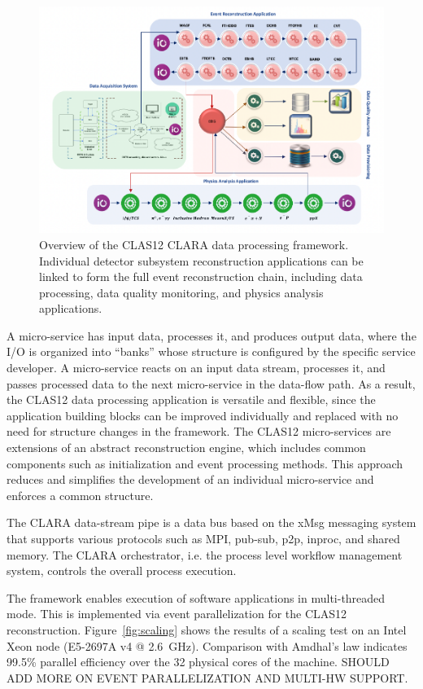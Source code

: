 \begin{figure}[t]
\centering
\includegraphics[width=1.0\textwidth]{pics/clara-overview.pdf}
\caption{Overview of the CLAS12 CLARA data processing framework.  Individual detector subsystem
  reconstruction applications can be linked to form the full event reconstruction chain, including  data processing,
  data quality monitoring, and physics analysis applications.}
\label{fig:clara-overview}
\end{figure}

A micro-service has input data, processes it, and produces output data, where the I/O is organized into ``banks''
whose structure is configured by the specific service developer.  A micro-service reacts on an input data stream,
processes it, and passes processed data to the next micro-service in the data-flow path.  As a result, the CLAS12
data processing application is versatile and flexible, since the application building blocks can be improved individually
and replaced with no need for structure changes in the framework. The CLAS12 micro-services are extensions of an
abstract reconstruction engine, which includes common components such as initialization and event processing
methods. This approach reduces and simplifies the development of an individual micro-service and enforces a common
structure. 

The CLARA data-stream pipe is a data bus based on the xMsg messaging system that supports various protocols
such as MPI, pub-sub, p2p, inproc, and shared memory. The CLARA orchestrator, i.e. the process level workflow
management system, controls the overall process execution. 

The framework enables execution of software applications in multi-threaded mode. This is implemented via event
parallelization for the CLAS12 reconstruction. Figure~\ref{fig:scaling} shows the results of a scaling test on an
Intel Xeon node (E5-2697A v4 @ 2.6~GHz). Comparison with Amdhal's law indicates 99.5\% parallel efficiency over
the 32 physical cores of the machine.
{\color{red} SHOULD ADD MORE ON EVENT PARALLELIZATION AND MULTI-HW SUPPORT.}

